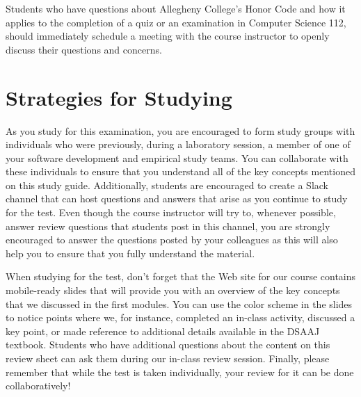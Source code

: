 \noindent Students who have questions about Allegheny College's Honor Code and how it applies to the completion of a
quiz or an examination in Computer Science 112, should immediately schedule a meeting with the course instructor to
openly discuss their questions and concerns.

\vspace*{-.2in}
\section*{Strategies for Studying}
\vspace*{-.1in}

As you study for this examination, you are encouraged to form study groups with individuals who were previously, during
a laboratory session, a member of one of your software development and empirical study teams. You can collaborate with
these individuals to ensure that you understand all of the key concepts mentioned on this study guide. Additionally,
students are encouraged to create a Slack channel that can host questions and answers that arise as you continue to
study for the test. Even though the course instructor will try to, whenever possible, answer review questions that
students post in this channel, you are strongly encouraged to answer the questions posted by your colleagues as this
will also help you to ensure that you fully understand the material.


When studying for the test, don't forget that the Web site for our course contains mobile-ready slides that will provide
you with an overview of the key concepts that we discussed in the first modules. You can use the color scheme in the
slides to notice points where we, for instance, completed an in-class activity, discussed a key point, or made reference
to additional details available in the DSAAJ textbook. Students who have additional questions about the content on this
review sheet can ask them during our in-class review session. Finally, please remember that while the test is taken
individually, your review for it can be done collaboratively!


